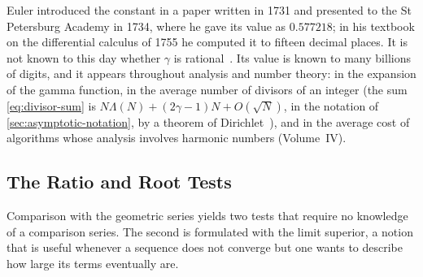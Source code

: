 \begin{table}
\end{table}

Euler introduced the constant in a paper written in 1731 and presented to the St Petersburg Academy in 1734, where he gave its value as $0.577218$; in his textbook on the differential calculus of 1755 he computed it to fifteen decimal places. It is not known to this day whether $\gamma$ is rational~\cite{lagarias2013gamma,havil2003gamma}. Its value is known to many billions of digits, and it appears throughout analysis and number theory: in the expansion of the gamma function, in the average number of divisors of an integer (the sum \eqref{eq:divisor-sum} is $N\Lambda(N)+(2\gamma-1)N+O(\sqrt N)$, in the notation of \cref{sec:asymptotic-notation}, by a theorem of Dirichlet~\cite{hardywright2008}), and in the average cost of algorithms whose analysis involves harmonic numbers (Volume~IV).

\subsection{The Ratio and Root Tests}

Comparison with the geometric series yields two tests that require no knowledge of a comparison series. The second is formulated with the limit superior, a notion that is useful whenever a sequence does not converge but one wants to describe how large its terms eventually are.

